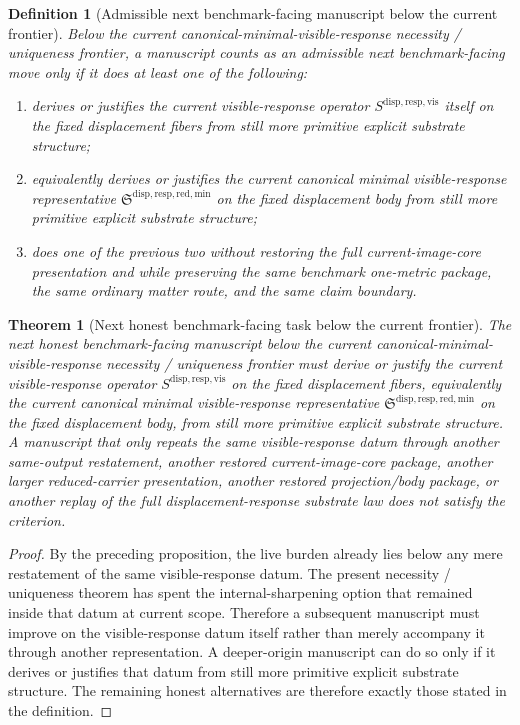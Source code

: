 \documentclass[11pt]{article}
\newcommand{\VisibleResponseOperator}{S^{\mathrm{disp,resp,vis}}}
\newcommand{\MinimalReducedStructure}{\mathfrak S^{\mathrm{disp,resp,red,min}}}
\newtheorem{definition}{Definition}
\newtheorem{theorem}{Theorem}
\begin{document}
\begin{definition}[Admissible next benchmark-facing manuscript below the current frontier]
Below the current canonical-minimal-visible-response necessity / uniqueness frontier, a manuscript counts as an admissible next benchmark-facing move only if it does at least one of the following:
\begin{enumerate}
    \item derives or justifies the current visible-response operator \(\VisibleResponseOperator\) itself on the fixed displacement fibers from still more primitive explicit substrate structure;
    \item equivalently derives or justifies the current canonical minimal visible-response representative \(\MinimalReducedStructure\) on the fixed displacement body from still more primitive explicit substrate structure;
    \item does one of the previous two without restoring the full current-image-core presentation and while preserving the same benchmark one-metric package, the same ordinary matter route, and the same claim boundary.
\end{enumerate}
\end{definition}

\begin{theorem}[Next honest benchmark-facing task below the current frontier]
The next honest benchmark-facing manuscript below the current canonical-minimal-visible-response necessity / uniqueness frontier must derive or justify the current visible-response operator \(\VisibleResponseOperator\) on the fixed displacement fibers, equivalently the current canonical minimal visible-response representative \(\MinimalReducedStructure\) on the fixed displacement body, from still more primitive explicit substrate structure. A manuscript that only repeats the same visible-response datum through another same-output restatement, another restored current-image-core package, another larger reduced-carrier presentation, another restored projection/body package, or another replay of the full displacement-response substrate law does not satisfy the criterion.
\end{theorem}

\begin{proof}
By the preceding proposition, the live burden already lies below any mere restatement of the same visible-response datum. The present necessity / uniqueness theorem has spent the internal-sharpening option that remained inside that datum at current scope. Therefore a subsequent manuscript must improve on the visible-response datum itself rather than merely accompany it through another representation. A deeper-origin manuscript can do so only if it derives or justifies that datum from still more primitive explicit substrate structure. The remaining honest alternatives are therefore exactly those stated in the definition.
\end{proof}
\end{document}
